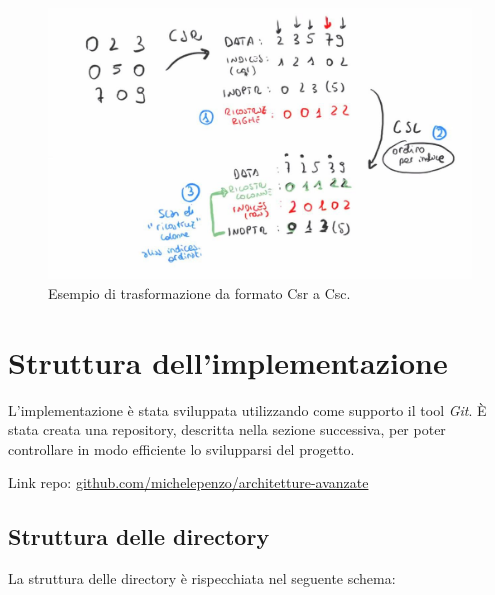 \documentclass[]{IEEEtran}
\begin{document}
	\begin{figure}[H]
		\includegraphics[scale=0.25]{csr-to-csc.jpg}
		\caption{Esempio di trasformazione da formato Csr a Csc.}
	\end{figure}

	
\section{Struttura dell'implementazione} 
\label{struttura}
	L'implementazione è stata sviluppata utilizzando come supporto il tool \textit{Git}. È stata creata una repository, descritta nella sezione successiva, per poter controllare in modo efficiente lo svilupparsi del progetto. \newline
	
	\noindent Link repo: 	\href{https://github.com/michelepenzo/architetture-avanzate}{github.com/michelepenzo/architetture-avanzate}\newline
	
	\subsection{Struttura delle directory}
	La struttura delle directory è rispecchiata nel seguente schema:
	\mbox{}
\end{document}
